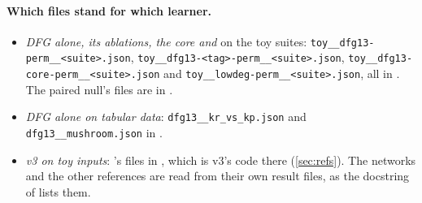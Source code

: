 \paragraph{Which files stand for which learner.}
\begin{itemize}\raggedright
\item \emph{DFG alone, its ablations, the core and } on the toy suites: \texttt{toy\_\_dfg13-perm\_\_<suite>.json}, \texttt{toy\_\_dfg13-<tag>-perm\_\_<suite>.json}, \texttt{toy\_\_dfg13-core-perm\_\_<suite>.json} and \texttt{toy\_\_lowdeg-perm\_\_<suite>.json}, all in . The paired null's files are in .
\item \emph{DFG alone on tabular data}: \texttt{dfg13\_\_kr\_vs\_kp.json} and \texttt{dfg13\_\_mushroom.json} in .
\item \emph{v3 on toy inputs}: 's files in , which is v3's code there (\cref{sec:refs}). The networks and the other references are read from their own result files, as the docstring of  lists them.
\end{itemize}

